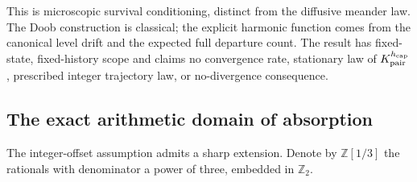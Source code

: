 \documentclass[11pt]{amsart}
\theoremstyle{definition}
\theoremstyle{remark}
\newcommand{\Z}{\mathbb Z}
\newcommand{\Ztwo}{\mathbb Z_2}
\begin{document}
This is microscopic survival conditioning, distinct from the diffusive
meander law. The Doob construction is classical; the explicit harmonic
function comes from the canonical level drift and the expected full
departure count. The result has fixed-state, fixed-history scope and
claims no convergence rate, stationary law of $K_{\rm pair}^{h_{\rm cap}}$, prescribed integer
trajectory law, or no-divergence consequence.

\subsection{The exact arithmetic domain of absorption}\label{triad:section}

The integer-offset assumption admits a sharp extension. Denote by
$\Z[1/3]$ the rationals with denominator a power of three, embedded
in $\Ztwo$.
\end{document}
